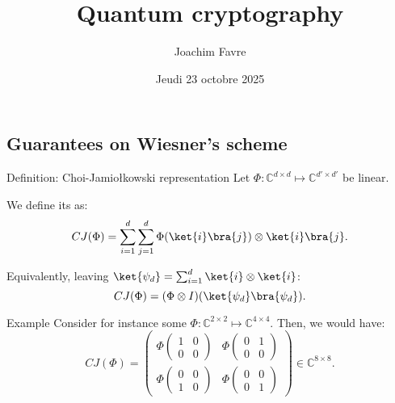 \documentclass[a4paper]{article}
\title{Quantum cryptography}
\author{Joachim Favre}
\date{Jeudi 23 octobre 2025}
\begin{document}
\maketitle


\subsection{Guarantees on Wiesner's scheme}

\begin{parag}{Definition: Choi-Jamio{\l}kowski representation}
    Let $\Phi: \mathbb{C}^{d \times d} \mapsto \mathbb{C}^{d' \times d'}$ be linear. 

    We define its  as: 
    \[CJ\left(\Phi\right) = \sum_{i = 1}^{d} \sum_{j=1}^{d} \Phi\left(\ket{i}\bra{j}\right) \otimes \ket{i}\bra{j}.\]
    
    Equivalently, leaving  $\ket{\psi_d} = \sum_{i=1}^{d} \ket{i} \otimes \ket{i}$: 
    \[CJ\left(\Phi\right) = \left(\Phi \otimes I\right) \left(\ket{\psi_d}\bra{\psi_d}\right).\]

    \begin{subparag}{Example}
        Consider for instance some $\Phi: \mathbb{C}^{2 \times 2} \mapsto \mathbb{C}^{4 \times 4}$. Then, we would have: 
        \[CJ\left(\Phi\right) = \begin{pmatrix} \Phi \begin{pmatrix} 1 & 0 \\ 0 & 0 \end{pmatrix}  & \Phi \begin{pmatrix} 0 & 1 \\ 0 & 0 \end{pmatrix} \\ \Phi \begin{pmatrix} 0 & 0 \\ 1 & 0 \end{pmatrix}  & \Phi \begin{pmatrix} 0 & 0 \\ 0 & 1 \end{pmatrix}  \end{pmatrix} \in \mathbb{C}^{8 \times 8}.\]
    \end{subparag}
\end{parag}
\end{document}
